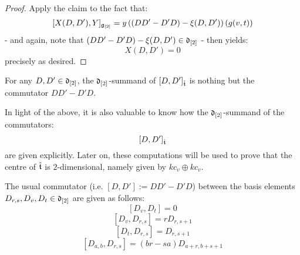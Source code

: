 \begin{proof}
                Apply the claim to the fact that:
                    $$[X(D, D'), Y]_{\mathfrak{g}_{[2]}} = y \left( ( DD' - D'D) - \xi(D, D') \right)( g(v, t) )$$
                - and again, note that $( DD' - D'D) - \xi(D, D') \in \mathfrak{d}_{[2]}$ - then yields:
                    $$X(D, D') = 0$$
                precisely as desired. 
            \end{proof}
        \begin{corollary}
            For any $D, D' \in \mathfrak{d}_{[2]}$, the $\mathfrak{d}_{[2]}$-summand of $[D, D']_{\hat{\mathfrak{t}}}$ is nothing but the commutator $DD' - D'D$.
        \end{corollary} 
        In light of the above, it is also valuable to know how the $\mathfrak{d}_{[2]}$-summand of the commutators:
            $$[D, D']_{\hat{\mathfrak{t}}}$$
        are given explicitly. Later on, these computations will be used to prove that the centre of $\hat{\mathfrak{t}}$ is $2$-dimensional, namely given by $k c_v \oplus k c_v$.
        \begin{lemma} \label{lemma: explicit_commutators_between_basis_elements_of_toroidal_central_orthogonal_complement}
            The usual commutator (i.e. $[D, D'] := DD' - D'D$) between the basis elements $D_{r, s}, D_v, D_t \in \mathfrak{d}_{[2]}$ are given as follows:
                $$[D_v, D_t] = 0$$
                $$[D_v, D_{r, s}] = r D_{r, s + 1}$$
                $$[D_t, D_{r, s}] = D_{r, s + 1}$$
                $$[D_{a, b}, D_{r, s}] = (br - sa) D_{a + r, b + s + 1}$$
        \end{lemma}
